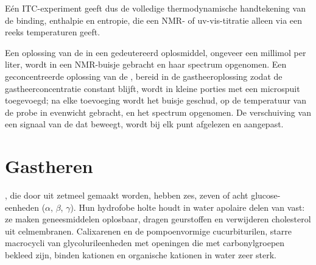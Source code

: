 Eén ITC-experiment geeft dus de volledige thermodynamische handtekening
van de binding, enthalpie en entropie, die een NMR- of
uv-vis-titratie alleen via een reeks temperaturen geeft.

\begin{inthelab}
Een oplossing van de  in een gedeutereerd oplosmiddel, ongeveer
een millimol per liter, wordt in een NMR-buisje gebracht en haar spectrum
opgenomen. Een geconcentreerde oplossing van de , bereid in de
gastheeroplossing zodat de gastheerconcentratie constant blijft, wordt in
kleine porties met een microspuit toegevoegd; na elke toevoeging wordt
het buisje geschud, op de temperatuur van de probe in evenwicht gebracht,
en het spectrum opgenomen. De verschuiving van een signaal van de
 dat beweegt, wordt bij elk punt afgelezen en aangepast.
\end{inthelab}

\section{Gastheren}

, die door  uit zetmeel gemaakt worden, hebben zes,
zeven of acht glucose-eenheden ($\alpha$, $\beta$, $\gamma$). Hun hydrofobe holte houdt in water apolaire delen van 
vast: ze maken geneesmiddelen oplosbaar, dragen geurstoffen en
verwijderen cholesterol uit celmembranen. Calixarenen en de pompoenvormige
cucurbiturilen, starre macrocycli van glycolurileenheden met openingen
die met carbonylgroepen bekleed zijn, binden kationen en organische
kationen in water zeer sterk.

